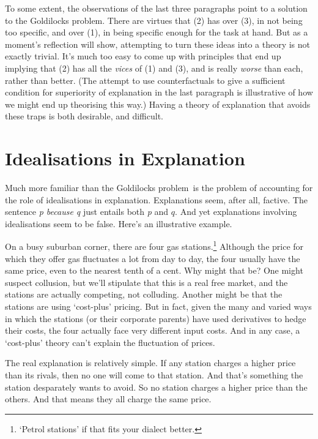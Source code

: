 \documentclass[
  10pt,
  letterpaper,
  DIV=11,
  numbers=noendperiod,
  twoside]{scrartcl}
\begin{document}
To some extent, the observations of the last three paragraphs point to a
solution to the Goldilocks problem. There are virtues that (2) has over
(3), in not being too specific, and over (1), in being specific enough
for the task at hand. But as a moment's reflection will show, attempting
to turn these ideas into a theory is not exactly trivial. It's much too
easy to come up with principles that end up implying that (2) has all
the \emph{vices} of (1) and (3), and is really \emph{worse} than each,
rather than better. (The attempt to use counterfactuals to give a
sufficient condition for superiority of explanation in the last
paragraph is illustrative of how we might end up theorising this way.)
Having a theory of explanation that avoids these traps is both
desirable, and difficult.

\section{Idealisations in
Explanation}\label{idealisations-in-explanation}

Much more familiar than the Goldilocks problem~is the problem of
accounting for the role of idealisations in explanation. Explanations
seem, after all, factive. The sentence \emph{p because q} just entails
both \emph{p} and \(q\). And yet explanations involving idealisations
seem to be false. Here's an illustrative example.

On a busy suburban corner, there are four gas stations.\footnote{`Petrol
  stations' if that fits your dialect better.} Although the price for
which they offer gas fluctuates a lot from day to day, the four usually
have the same price, even to the nearest tenth of a cent. Why might that
be? One might suspect collusion, but we'll stipulate that this is a real
free market, and the stations are actually competing, not colluding.
Another might be that the stations are using `cost-plus' pricing. But in
fact, given the many and varied ways in which the stations (or their
corporate parents) have used derivatives to hedge their costs, the four
actually face very different input costs. And in any case, a `cost-plus'
theory can't explain the fluctuation of prices.

The real explanation is relatively simple. If any station charges a
higher price than its rivals, then no one will come to that station. And
that's something the station desparately wants to avoid. So no station
charges a higher price than the others. And that means they all charge
the same price.
\end{document}
